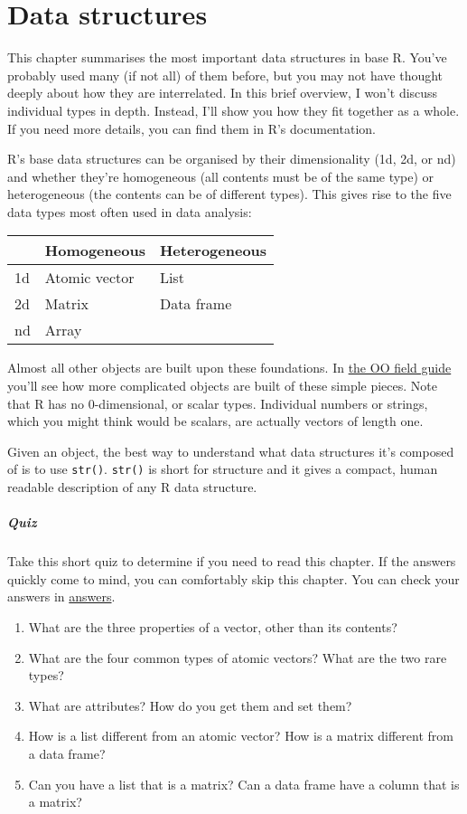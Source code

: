 \chapter{Data structures}\label{data-structures}

This chapter summarises the most important data structures in base R.
You've probably used many (if not all) of them before, but you may not
have thought deeply about how they are interrelated. In this brief
overview, I won't discuss individual types in depth. Instead, I'll show
you how they fit together as a whole. If you need more details, you can
find them in R's documentation.

R's base data structures can be organised by their dimensionality (1d,
2d, or nd) and whether they're homogeneous (all contents must be of the
same type) or heterogeneous (the contents can be of different types).
This gives rise to the five data types most often used in data analysis:

\begin{longtable}[c]{@{}lll@{}}
\toprule
& Homogeneous & Heterogeneous\tabularnewline
\midrule
\endhead
1d & Atomic vector & List\tabularnewline
2d & Matrix & Data frame\tabularnewline
nd & Array &\tabularnewline
\bottomrule
\end{longtable}

Almost all other objects are built upon these foundations. In
\hyperref[oo]{the OO field guide} you'll see how more complicated
objects are built of these simple pieces. Note that R has no
0-dimensional, or scalar types. Individual numbers or strings, which you
might think would be scalars, are actually vectors of length one.

Given an object, the best way to understand what data structures it's
composed of is to use \texttt{str()}. \texttt{str()} is short for
structure and it gives a compact, human readable description of any R
data structure. 

\paragraph{Quiz}

Take this short quiz to determine if you need to read this chapter. If
the answers quickly come to mind, you can comfortably skip this chapter.
You can check your answers in
\hyperref[data-structure-answers]{answers}.

\begin{enumerate}
\def\labelenumi{\arabic{enumi}.}
\item
  What are the three properties of a vector, other than its contents?
\item
  What are the four common types of atomic vectors? What are the two
  rare types?
\item
  What are attributes? How do you get them and set them?
\item
  How is a list different from an atomic vector? How is a matrix
  different from a data frame?
\item
  Can you have a list that is a matrix? Can a data frame have a column
  that is a matrix?
\end{enumerate}

